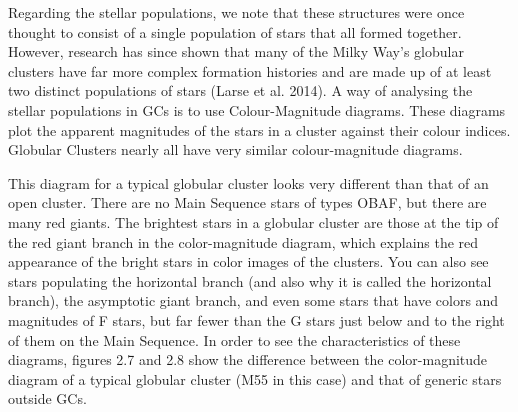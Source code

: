 Regarding the stellar populations, we note that these structures were once thought to consist of a single population of stars that all formed together. However, research has since shown that many of the Milky Way's globular clusters have far more complex formation histories and are made up of at least two distinct populations of stars (Larse et al. 2014). A way of analysing the stellar populations in GCs is to use Colour-Magnitude diagrams. These diagrams plot the apparent magnitudes of the stars in a cluster against their colour indices. Globular Clusters nearly all have very similar colour-magnitude diagrams.

This diagram for a typical globular cluster looks very different than that of an open cluster. There are no Main Sequence stars of types OBAF, but there are many red giants. The brightest stars in a globular cluster are those at the tip of the red giant branch in the color-magnitude diagram, which explains the red appearance of the bright stars in color images of the clusters. You can also see stars populating the horizontal branch (and also why it is called the horizontal branch), the asymptotic giant branch, and even some stars that have colors and magnitudes of F stars, but far fewer than the G stars just below and to the right of them on the Main Sequence. In order to see the characteristics of these diagrams, figures 2.7 and 2.8 show the difference between the color-magnitude diagram of a typical globular cluster (M55 in this case) and that of generic stars outside GCs.

